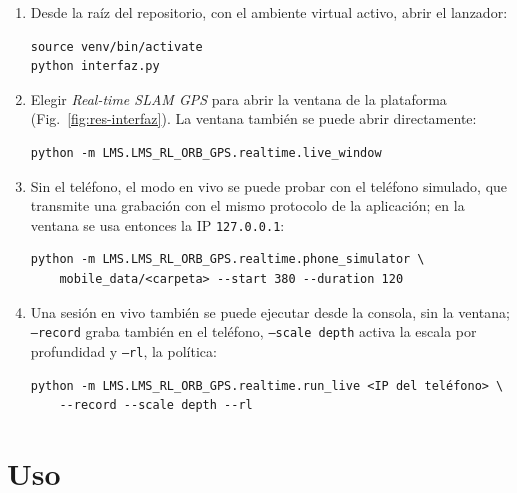 \begin{enumerate}
\item Desde la raíz del repositorio, con el ambiente virtual activo, abrir el lanzador:
\begin{small}
\begin{verbatim}
source venv/bin/activate
python interfaz.py
\end{verbatim}
\end{small}

\item Elegir \textit{Real-time SLAM GPS} para abrir la ventana de la plataforma (Fig.~\ref{fig:res-interfaz}).
La ventana también se puede abrir directamente:
\begin{small}
\begin{verbatim}
python -m LMS.LMS_RL_ORB_GPS.realtime.live_window
\end{verbatim}
\end{small}

\item Sin el teléfono, el modo en vivo se puede probar con el teléfono simulado, que transmite una grabación con el mismo protocolo de la aplicación; en la ventana se usa entonces la IP \texttt{127.0.0.1}:
\begin{small}
\begin{verbatim}
python -m LMS.LMS_RL_ORB_GPS.realtime.phone_simulator \
    mobile_data/<carpeta> --start 380 --duration 120
\end{verbatim}
\end{small}

\item Una sesión en vivo también se puede ejecutar desde la consola, sin la ventana; \texttt{--record} graba también en el teléfono, \texttt{--scale depth} activa la escala por profundidad y \texttt{--rl}, la política:
\begin{small}
\begin{verbatim}
python -m LMS.LMS_RL_ORB_GPS.realtime.run_live <IP del teléfono> \
    --record --scale depth --rl
\end{verbatim}
\end{small}
\end{enumerate}

\section{Uso}

